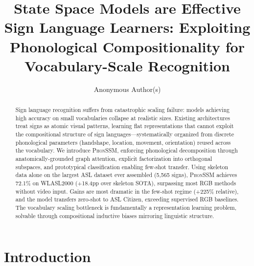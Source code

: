\documentclass[runningheads]{llncs}
\newcommand{\phonssm}{\textsc{PhonSSM}}
\begin{document}
\title{State Space Models are Effective Sign Language Learners: Exploiting Phonological Compositionality for Vocabulary-Scale Recognition}


\author{Anonymous Author(s)}



\maketitle

\begin{abstract}
Sign language recognition suffers from catastrophic scaling failure: models achieving high accuracy on small vocabularies collapse at realistic sizes. Existing architectures treat signs as atomic visual patterns, learning flat representations that cannot exploit the compositional structure of sign languages---systematically organized from discrete phonological parameters (handshape, location, movement, orientation) reused across the vocabulary. We introduce \phonssm{}, enforcing phonological decomposition through anatomically-grounded graph attention, explicit factorization into orthogonal subspaces, and prototypical classification enabling few-shot transfer. Using skeleton data alone on the largest ASL dataset ever assembled (5,565 signs), \phonssm{} achieves 72.1\% on WLASL2000 (+18.4pp over skeleton SOTA), surpassing most RGB methods without video input. Gains are most dramatic in the few-shot regime (+225\% relative), and the model transfers zero-shot to ASL Citizen, exceeding supervised RGB baselines. The vocabulary scaling bottleneck is fundamentally a representation learning problem, solvable through compositional inductive biases mirroring linguistic structure.

\end{abstract}

\section{Introduction}
\end{document}
